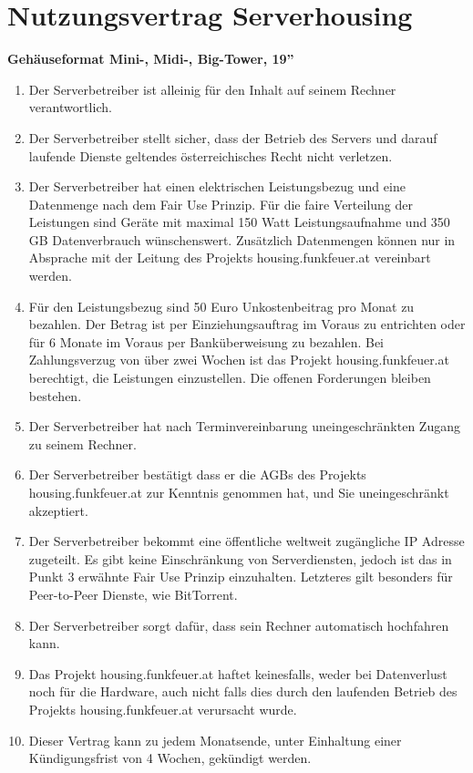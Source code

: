 \documentclass[parskip=half]{scrreport}
\begin{document}
\chapter*{Nutzungsvertrag Serverhousing}
\vspace{-0.8cm}
\textbf{Gehäuseformat Mini-, Midi-, Big-Tower, 19''\\}


\begin{contract}
\begin{enumerate}
\item Der Serverbetreiber ist alleinig für den Inhalt auf seinem Rechner verantwortlich.
\item Der Serverbetreiber stellt sicher, dass der Betrieb des Servers und darauf laufende Dienste geltendes österreichisches Recht nicht verletzen.
\item Der Serverbetreiber hat einen elektrischen Leistungsbezug und eine Datenmenge nach dem Fair Use Prinzip. Für die faire Verteilung der Leistungen sind Geräte mit maximal 150 Watt Leistungsaufnahme und 350 GB Datenverbrauch wünschenswert. Zusätzlich Datenmengen können nur in Absprache mit der Leitung des Projekts housing.funkfeuer.at vereinbart werden.
\item Für den Leistungsbezug sind 50 Euro Unkostenbeitrag pro Monat zu bezahlen. Der Betrag ist per Einziehungsauftrag im Voraus zu entrichten oder für 6 Monate im Voraus per Banküberweisung zu bezahlen. Bei Zahlungsverzug von über zwei Wochen ist das Projekt housing.funkfeuer.at berechtigt, die Leistungen einzustellen. Die offenen Forderungen bleiben bestehen.
\item Der Serverbetreiber hat nach Terminvereinbarung uneingeschränkten Zugang zu seinem Rechner.
\item Der Serverbetreiber bestätigt dass er die AGBs des Projekts housing.funkfeuer.at zur Kenntnis genommen hat, und Sie uneingeschränkt akzeptiert.
\item Der Serverbetreiber bekommt eine öffentliche weltweit zugängliche IP Adresse zugeteilt. Es gibt keine Einschränkung von Serverdiensten, jedoch ist das in Punkt 3 erwähnte Fair Use Prinzip einzuhalten. Letzteres gilt besonders für Peer-to-Peer Dienste, wie BitTorrent.
\item Der Serverbetreiber sorgt dafür, dass sein Rechner automatisch hochfahren kann.
\item Das Projekt housing.funkfeuer.at haftet keinesfalls, weder bei Datenverlust noch für die Hardware, auch nicht falls dies durch den laufenden Betrieb des Projekts housing.funkfeuer.at verursacht wurde.
\item Dieser Vertrag kann zu jedem Monatsende, unter Einhaltung einer Kündigungsfrist von 4 Wochen, gekündigt werden.
\end{enumerate}
\end{contract}



%
\end{document}
